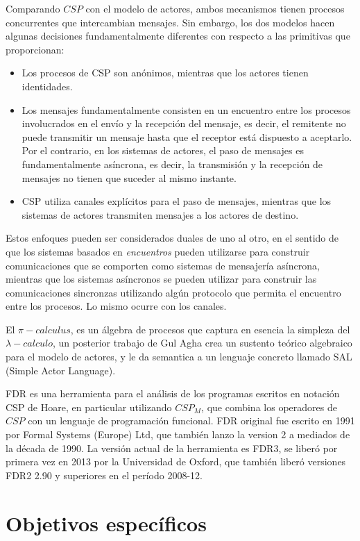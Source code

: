 \documentclass{article}
\begin{document}
Comparando $CSP$ con el modelo de actores, ambos mecanismos tienen procesos concurrentes que intercambian mensajes. Sin embargo, los dos modelos hacen algunas decisiones fundamentalmente diferentes con respecto a las primitivas que proporcionan:

\begin{itemize}
\item Los procesos de CSP son anónimos, mientras que los actores tienen identidades.
\item Los mensajes fundamentalmente consisten en un encuentro entre los procesos involucrados en el envío y la recepción del mensaje, es decir, el remitente no puede transmitir un mensaje hasta que el receptor está dispuesto a aceptarlo. Por el contrario, en los sistemas de actores, el paso de mensajes es fundamentalmente asíncrona, es decir, la transmisión y la recepción de mensajes no tienen que suceder al mismo instante.
\item CSP utiliza canales explícitos para el paso de mensajes, mientras que los sistemas de actores transmiten mensajes a los actores de destino.
\end{itemize}

Estos enfoques pueden ser considerados duales de uno al otro, en el sentido de que los sistemas basados en \emph{encuentros} pueden utilizarse para construir comunicaciones que se comporten como sistemas de mensajería asíncrona, mientras que los sistemas asíncronos se pueden utilizar para construir las comunicaciones sincronzas utilizando algún protocolo que permita el encuentro entre los procesos. Lo mismo ocurre con los canales.

El $\pi-calculus$, es un álgebra de procesos que captura en esencia la simpleza del $\lambda-calculo$, un posterior trabajo de Gul Agha\cite{apicalculus} crea un sustento teórico algebraico para el modelo de actores, y le da semantica a un lenguaje concreto llamado SAL (Simple Actor Language).

FDR es una herramienta para el análisis de los programas escritos en notación CSP de Hoare, en particular utilizando $CSP_M$, que combina los operadores de $CSP$ con un lenguaje de programación funcional. FDR original fue escrito en 1991 por Formal Systems (Europe) Ltd, que también lanzo la version 2 a mediados de la década de 1990. La versión actual de la herramienta es FDR3, se liberó por primera vez en 2013 por la Universidad de Oxford, que también liberó versiones FDR2 2.90 y superiores en el período 2008-12.

\section{Objetivos específicos}
\end{document}
